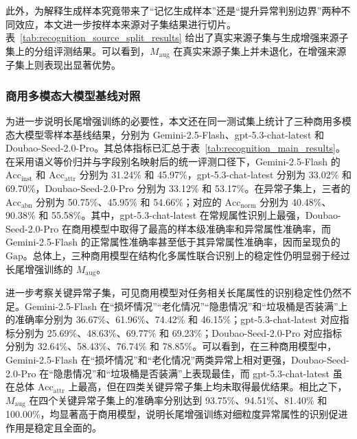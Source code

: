 此外，为解释生成样本究竟带来了“记忆生成样本”还是“提升异常判别边界”两种不同效应，本文进一步按样本来源对子集结果进行切片。表~\ref{tab:recognition_source_split_results} 给出了真实来源子集与生成增强来源子集上的分组评测结果。可以看到，$M_{\mathrm{aug}}$ 在真实来源子集上并未退化，在增强来源子集上则表现出显著优势。

\begin{table}[htbp]
\centering
\caption{不同识别模型按样本来源切片的结果对比}
\label{tab:recognition_source_split_results}
\end{table}

\subsubsection{商用多模态大模型基线对照}

为进一步说明长尾增强训练的必要性，本文还在同一测试集上统计了三种商用多模态大模型零样本基线结果，分别为 Gemini-2.5-Flash、gpt-5.3-chat-latest 和 Doubao-Seed-2.0-Pro。其总体指标已汇总于表~\ref{tab:recognition_main_results}。在采用语义等价归并与字段别名映射后的统一评测口径下，Gemini-2.5-Flash 的 $\mathrm{Acc}_{\mathrm{inst}}$ 和 $\mathrm{Acc}_{\mathrm{attr}}$ 分别为 31.24\% 和 45.97\%，gpt-5.3-chat-latest 分别为 33.02\% 和 69.70\%，Doubao-Seed-2.0-Pro 分别为 33.12\% 和 53.17\%。在异常子集上，三者的 $\mathrm{Acc}_{\mathrm{abn}}$ 分别为 50.75\%、45.95\% 和 54.66\%；对应的 $\mathrm{Acc}_{\mathrm{norm}}$ 分别为 40.48\%、90.38\% 和 55.58\%。其中，gpt-5.3-chat-latest 在常规属性识别上最强，Doubao-Seed-2.0-Pro 在商用模型中取得了最高的样本级准确率和异常属性准确率，而 Gemini-2.5-Flash 的正常属性准确率甚至低于其异常属性准确率，因而呈现负的 $\mathrm{Gap}$。总体上，三种商用模型在结构化多属性联合识别上的稳定性仍明显弱于经过长尾增强训练的 $M_{\mathrm{aug}}$。

进一步考察关键异常子集，可见商用模型对任务相关长尾属性的识别稳定性仍然不足。Gemini-2.5-Flash 在“损坏情况”“老化情况”“隐患情况”和“垃圾桶是否装满”上的准确率分别为 36.67\%、61.96\%、74.42\% 和 46.15\%；gpt-5.3-chat-latest 对应指标分别为 25.69\%、48.63\%、69.77\% 和 69.23\%；Doubao-Seed-2.0-Pro 对应指标分别为 32.64\%、58.43\%、76.74\% 和 78.85\%。可以看到，在三种商用模型中，Gemini-2.5-Flash 在“损坏情况”和“老化情况”两类异常上相对更强，Doubao-Seed-2.0-Pro 在“隐患情况”和“垃圾桶是否装满”上表现最佳，而 gpt-5.3-chat-latest 虽在总体 $\mathrm{Acc}_{\mathrm{attr}}$ 上最高，但在四类关键异常子集上均未取得最优结果。相比之下，$M_{\mathrm{aug}}$ 在四个关键异常子集上的准确率分别达到 93.75\%、94.51\%、81.40\% 和 100.00\%，均显著高于商用模型，说明长尾增强训练对细粒度异常属性的识别促进作用是稳定且全面的。

